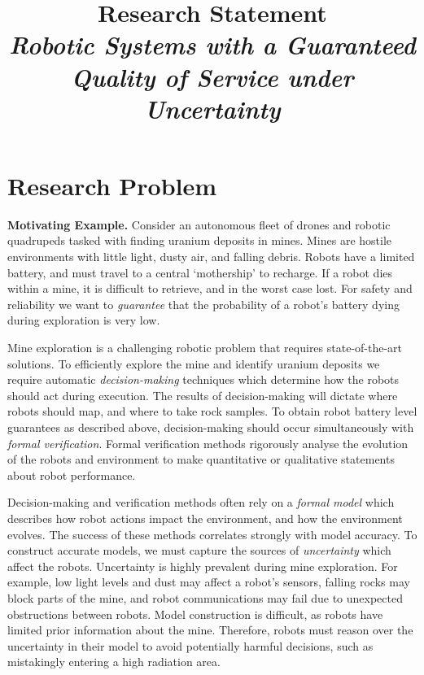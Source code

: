 \documentclass[12pt]{article}
\title{Research Statement\\ \large \emph{Robotic Systems with a Guaranteed Quality of Service under Uncertainty}}
\date{}
\author{}
\begin{document}
\maketitle
\thispagestyle{empty}

\section*{Research Problem}

\vspace*{1ex}\noindent\textbf{Motivating Example.} Consider an autonomous fleet of drones and robotic quadrupeds tasked with finding uranium deposits in mines.
%
Mines are hostile environments with little light, dusty air, and falling debris. 
%
Robots have a limited battery, and must travel to a central `mothership' to recharge.
%
If a robot dies within a mine, it is difficult to retrieve, and in the worst case lost.
%
For safety and reliability we want to \emph{guarantee} that the probability of a robot's battery dying during exploration is very low.

Mine exploration is a challenging robotic problem that requires state-of-the-art solutions.
%
To efficiently explore the mine and identify uranium deposits we require automatic \emph{decision-making} techniques which determine how the robots should act during execution.
%
The results of decision-making will dictate where robots should map, and where to take rock samples.
%
To obtain robot battery level guarantees as described above, decision-making should occur simultaneously with \emph{formal verification}.
%
Formal verification methods rigorously analyse the evolution of the robots and environment to make quantitative or qualitative statements about robot performance.

Decision-making and verification methods often rely on a \emph{formal model} which describes how robot actions impact the environment, and how the environment evolves.
%
The success of these methods correlates strongly with model accuracy.
%
To construct accurate models, we must capture the sources of \emph{uncertainty} which affect the robots.
%
Uncertainty is highly prevalent during mine exploration.
%
For example, low light levels and dust may affect a robot's sensors, falling rocks may block parts of the mine, and robot communications may fail due to unexpected obstructions between robots.
%
Model construction is difficult, as robots have limited prior information about the mine.
%
Therefore, robots must reason over the uncertainty in their model to avoid potentially harmful decisions, such as mistakingly entering a high radiation area.
\end{document}
